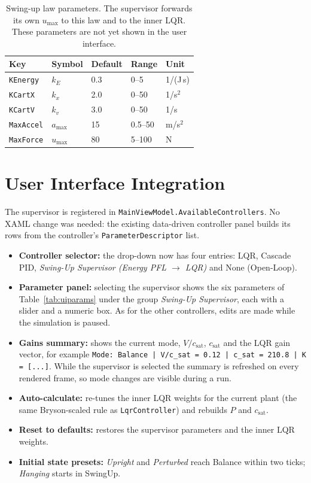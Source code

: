 \documentclass[11pt,a4paper]{article}
\newcommand{\code}[1]{\texttt{#1}}
\newcommand{\csat}{c_{\mathrm{sat}}}
\newcommand{\umax}{u_{\max}}
\begin{document}
\begin{table}[h]
\centering
\begin{tabular}{@{}l l l l l@{}}
\toprule
Key & Symbol & Default & Range & Unit \\
\midrule
\code{KEnergy} & $k_E$ & 0.3 & 0--5 & 1/(J\,s) \\
\code{KCartX} & $k_x$ & 2.0 & 0--50 & 1/s$^2$ \\
\code{KCartV} & $k_v$ & 3.0 & 0--50 & 1/s \\
\code{MaxAccel} & $a_{\max}$ & 15 & 0.5--50 & m/s$^2$ \\
\code{MaxForce} & $\umax$ & 80 & 5--100 & N \\
\bottomrule
\end{tabular}
\caption{Swing-up law parameters. The supervisor forwards its own $\umax$ to this law and to
the inner LQR. These parameters are not yet shown in the user interface.}
\label{tab:swingup}
\end{table}

\section{User Interface Integration}\label{sec:ui}
The supervisor is registered in \code{MainViewModel.AvailableControllers}. No XAML change was
needed: the existing data-driven controller panel builds its rows from the controller's
\code{ParameterDescriptor} list.
\begin{itemize}
\item \textbf{Controller selector:} the drop-down now has four entries: LQR, Cascade PID,
\emph{Swing-Up Supervisor (Energy PFL $\rightarrow$ LQR)} and None (Open-Loop).
\item \textbf{Parameter panel:} selecting the supervisor shows the six parameters of
Table~\ref{tab:uiparams} under the group \emph{Swing-Up Supervisor}, each with a slider and a
numeric box. As for the other controllers, edits are made while the simulation is paused.
\item \textbf{Gains summary:} shows the current mode, $V/\csat$, $\csat$ and the LQR gain vector,
for example \code{Mode: Balance | V/c\_sat = 0.12 | c\_sat = 210.8 | K = [...]}. While the
supervisor is selected the summary is refreshed on every rendered frame, so mode changes are
visible during a run.
\item \textbf{Auto-calculate:} re-tunes the inner LQR weights for the current plant (the same
Bryson-scaled rule as \code{LqrController}) and rebuilds $P$ and $\csat$.
\item \textbf{Reset to defaults:} restores the supervisor parameters and the inner LQR weights.
\item \textbf{Initial state presets:} \emph{Upright} and \emph{Perturbed} reach Balance within two
ticks; \emph{Hanging} starts in SwingUp.
\end{itemize}
\end{document}
